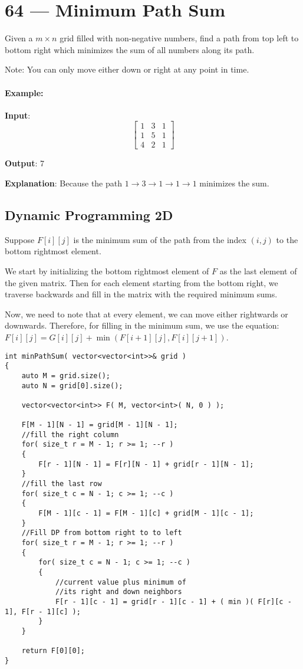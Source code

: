 \section{64 --- Minimum Path Sum}
Given a $m \times n$ grid filled with non-negative numbers, find a path from top left to bottom right which minimizes the sum of all numbers along its path.

Note: You can only move either down or right at any point in time.

\paragraph{Example:}
\begin{flushleft}


\textbf{Input}:
\[
\begin{bmatrix}
1 & 3 & 1\\
1 & 5 & 1\\
4 & 2 & 1
\end{bmatrix}
\]

\textbf{Output}: 7

\textbf{Explanation}: Because the path $1\to 3 \to 1 \to 1 \to 1$ minimizes the sum.


\end{flushleft}

\subsection{Dynamic Programming 2D}
Suppose $F[i][j]$ is the minimum sum of the path from the index $(i,j)$ to the bottom rightmost element. 

We start by initializing the bottom rightmost element of $F$ as the last element of the given matrix. Then for each element starting from the bottom right, we traverse backwards and fill in the matrix with the required minimum sums. 

Now, we need to note that at every element, we can move either rightwards or downwards. Therefore, for filling in the minimum sum, we use the equation: $F[i][j] = G[i][j] + \min(F[i+1][j], F[i][j+1])$.

\setcounter{lstlisting}{0}
\begin{lstlisting}[style=customc, caption={2D DP}]
int minPathSum( vector<vector<int>>& grid )
{
    auto M = grid.size();
    auto N = grid[0].size();

    vector<vector<int>> F( M, vector<int>( N, 0 ) );

    F[M - 1][N - 1] = grid[M - 1][N - 1];
    //fill the right column
    for( size_t r = M - 1; r >= 1; --r )
    {
        F[r - 1][N - 1] = F[r][N - 1] + grid[r - 1][N - 1];
    }
    //fill the last row
    for( size_t c = N - 1; c >= 1; --c )
    {
        F[M - 1][c - 1] = F[M - 1][c] + grid[M - 1][c - 1];
    }
    //Fill DP from bottom right to to left
    for( size_t r = M - 1; r >= 1; --r )
    {
        for( size_t c = N - 1; c >= 1; --c )
        {
            //current value plus minimum of
            //its right and down neighbors
            F[r - 1][c - 1] = grid[r - 1][c - 1] + ( min )( F[r][c - 1], F[r - 1][c] );
        }
    }

    return F[0][0];
}
\end{lstlisting}

